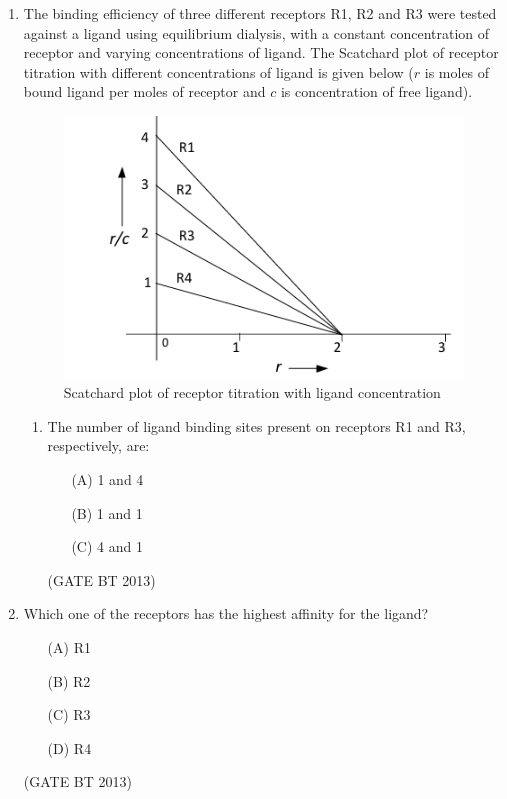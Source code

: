 \documentclass[journal,12pt,onecolumn]{IEEEtran}
\theoremstyle{remark}
\begin{document}
\begin{enumerate}
\item 
The binding efficiency of three different receptors R1, R2 and R3 were tested against a ligand using 
equilibrium dialysis, with a constant concentration of receptor and varying concentrations of ligand. 
The Scatchard plot of receptor titration with different concentrations of ligand is given below 
(\(r\) is moles of bound ligand per moles of receptor and \(c\) is concentration of free ligand).

\begin{figure}[htbp]
  \centering
  \includegraphics[width=\columnwidth]{figs/scatchard_plot.png}
  \caption{Scatchard plot of receptor titration with ligand concentration}
  \label{fig:scatchard_plot}
\end{figure}

\begin{enumerate}
    \item The number of ligand binding sites present on receptors R1 and R3, respectively, are:
    \begin{enumerate}
        \item[(A)] 1 and 4
        \item[(B)] 1 and 1
        \item[(C)] 4 and 1
    \end{enumerate} \hfill(GATE BT 2013)
\end{enumerate}

    \item Which one of the receptors has the highest affinity for the ligand?
    \begin{enumerate}
        \item[(A)] R1
        \item[(B)] R2
        \item[(C)] R3
        \item[(D)] R4
    \end{enumerate} \hfill(GATE BT 2013)



\end{enumerate}
\end{document}
